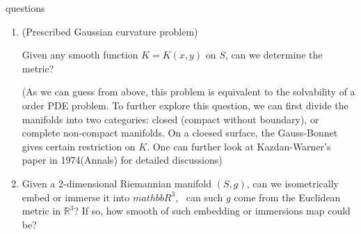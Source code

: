 questions
\begin{enumerate}
    \item (Prescribed Gaussian curvature problem) 
    
    Given any smooth function
    \(K=K(x,y)\) on \(S\), can we determine the metric?

    (As we can guess from above, this problem is equivalent to the 
    solvability of a  order PDE problem. To further
    explore this question, we can first divide the manifolds into 
    two categories: closed (compact without boundary), or complete 
    non-compact manifolds. On a cloesed surface, the Gauss-Bonnet gives 
    certain restriction on \(K\). One can further look at Kazdan-Warner's
    paper in 1974(Annals) for detailed discussions)
    \item Given a 2-dimensional Riemannian manifold \((S,g)\), can we
    isometrically embed or immerse it into \(mathbb{R}^3\), \ie\ can such
    \(g\) come from the Euclidean metric in \(\mathbb{R}^3\)?
    If so, how smooth of such embedding or immersions map could be?


\end{enumerate}

